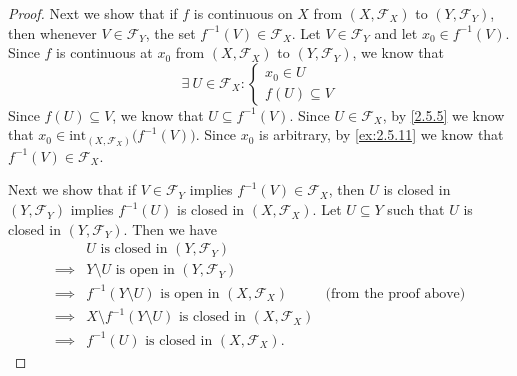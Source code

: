\begin{proof}
  Next we show that if \(f\) is continuous on \(X\) from \((X, \mathcal{F}_X)\) to \((Y, \mathcal{F}_Y)\), then whenever \(V \in \mathcal{F}_Y\), the set \(f^{-1}(V) \in \mathcal{F}_X\).
  Let \(V \in \mathcal{F}_Y\) and let \(x_0 \in f^{-1}(V)\).
  Since \(f\) is continuous at \(x_0\) from \((X, \mathcal{F}_X)\) to \((Y, \mathcal{F}_Y)\), we know that
  \[
    \exists\ U \in \mathcal{F}_X : \begin{cases}
      x_0 \in U \\
      f(U) \subseteq V
    \end{cases}
  \]
  Since \(f(U) \subseteq V\), we know that \(U \subseteq f^{-1}(V)\).
  Since \(U \in \mathcal{F}_X\), by \cref{2.5.5} we know that \(x_0 \in \text{int}_{(X, \mathcal{F}_X)}\big(f^{-1}(V)\big)\).
  Since \(x_0\) is arbitrary, by \cref{ex:2.5.11} we know that \(f^{-1}(V) \in \mathcal{F}_X\).

  Next we show that if \(V \in \mathcal{F}_Y\) implies \(f^{-1}(V) \in \mathcal{F}_X\), then \(U\) is closed in \((Y, \mathcal{F}_Y)\) implies \(f^{-1}(U)\) is closed in \((X, \mathcal{F}_X)\).
  Let \(U \subseteq Y\) such that \(U\) is closed in \((Y, \mathcal{F}_Y)\).
  Then we have
  \begin{align*}
             & U \text{ is closed in } (Y, \mathcal{F}_Y)                                                                 \\
    \implies & Y \setminus U \text{ is open in } (Y, \mathcal{F}_Y)                                                       \\
    \implies & f^{-1}(Y \setminus U) \text{ is open in } (X, \mathcal{F}_X)               & \text{(from the proof above)} \\
    \implies & X \setminus f^{-1}(Y \setminus U) \text{ is closed in } (X, \mathcal{F}_X)                                 \\
    \implies & f^{-1}(U) \text{ is closed in } (X, \mathcal{F}_X).
  \end{align*}


\end{proof}
